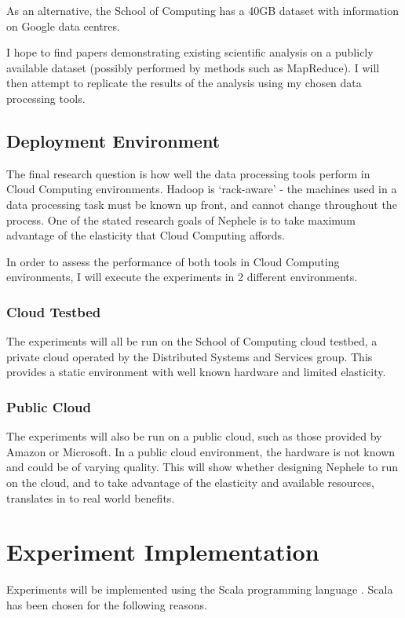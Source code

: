 As an alternative, the School of Computing has a 40GB dataset with information on Google data centres. 

I hope to find papers demonstrating existing scientific analysis on a publicly available dataset (possibly performed by methods such as MapReduce). I will then attempt to replicate the results of the analysis using my chosen data processing tools.

\subsection{Deployment Environment}
The final research question is how well the data processing tools perform in Cloud Computing environments. Hadoop is `rack-aware' - the machines used in a data processing task must be known up front, and cannot change throughout the process. One of the stated research goals of Nephele is to take maximum advantage of the elasticity that Cloud Computing affords.

In order to assess the performance of both tools in Cloud Computing environments, I will execute the experiments in 2 different environments.

\subsubsection{Cloud Testbed}
The experiments will all be run on the School of Computing cloud testbed, a private cloud operated by the Distributed Systems and Services group. This provides a static environment with well known hardware and limited elasticity. 

\subsubsection{Public Cloud}
The experiments will also be run on a public cloud, such as those provided by Amazon or Microsoft. In a public cloud environment, the hardware is not known and could be of varying quality. This will show whether designing Nephele to run on the cloud, and to take advantage of the elasticity and available resources, translates in to real world benefits.

\section{Experiment Implementation}
Experiments will be implemented using the Scala programming language \cite{scalalang}. Scala has been chosen for the following reasons.


